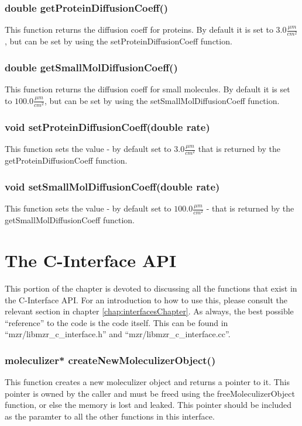 \subsubsection{double getProteinDiffusionCoeff()}
This function returns the diffusion coeff for proteins.  By default it
is set to $3.0\frac{\mu m}{cm^2}$, but can be set by using the
setProteinDiffusionCoeff function.

\subsubsection{double getSmallMolDiffusionCoeff()}
This function returns the diffusion coeff for small molecules.  By default it
is set to $100.0\frac{\mu m}{cm^2}$, but can be set by using the
setSmallMolDiffusionCoeff function.

\subsubsection{void setProteinDiffusionCoeff(double rate)}
This function sets the value - by default set to $3.0\frac{\mu
  m}{cm^2}$ that is returned by the getProteinDiffusionCoeff function.

\subsubsection{void setSmallMolDiffusionCoeff(double rate)}

This function sets the value - by default set to $100.0\frac{\mu
  m}{cm^2}$ - that is returned by the getSmallMolDiffusionCoeff function.

\section{The C-Interface API}
This portion of the chapter is devoted to discussing all the functions
that exist in the C-Interface API.  For an introduction to how to use
this, please consult the relevant section in chapter
\ref{chap:interfacesChapter}.  As always, the best possible
``reference'' to the code is the code itself.  This can be found in
``mzr/libmzr\_c\_interface.h'' and ``mzr/libmzr\_c\_interface.cc''.

\subsubsection{moleculizer* createNewMoleculizerObject()}
This function creates a new moleculizer object and returns a pointer
to it.  This pointer is owned by the caller and must be freed using
the freeMoleculizerObject function, or else the memory is lost and
leaked.  This pointer should be included as the paramter to all the
other functions in this interface.    

